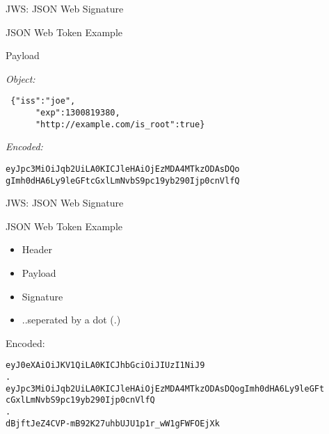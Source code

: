 \begin{frame}[fragile]{JWS: JSON Web Signature}

JSON Web Token Example

\begin{block}{Payload}

\emph{Object:}

\begin{verbatim}
 {"iss":"joe",
      "exp":1300819380,
      "http://example.com/is_root":true}
\end{verbatim}

\emph{Encoded:}

\begin{verbatim}
eyJpc3MiOiJqb2UiLA0KICJleHAiOjEzMDA4MTkzODAsDQo
gImh0dHA6Ly9leGFtcGxlLmNvbS9pc19yb290Ijp0cnVlfQ
\end{verbatim}

\end{block}

\end{frame}

\begin{frame}[fragile]{JWS: JSON Web Signature}

JSON Web Token Example

\begin{itemize}
\itemsep1pt\parskip0pt
\item
  Header
\item
  Payload
\item
  Signature
\item
  ..seperated by a dot (.)
\end{itemize}

Encoded:

\small

\begin{verbatim}
eyJ0eXAiOiJKV1QiLA0KICJhbGciOiJIUzI1NiJ9
.
eyJpc3MiOiJqb2UiLA0KICJleHAiOjEzMDA4MTkzODAsDQogImh0dHA6Ly9leGFt
cGxlLmNvbS9pc19yb290Ijp0cnVlfQ
.
dBjftJeZ4CVP-mB92K27uhbUJU1p1r_wW1gFWFOEjXk
\end{verbatim}

\end{frame}

